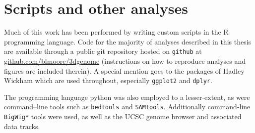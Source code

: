 \documentclass[a4paper,11pt,oneside]{book}
\begin{document}
\section{Scripts and other analyses}

Much of this work has been performed by writing custom scripts in the R programming language.\cite{Ihaka1996} Code for the majority of analyses described in this thesis are available through a public git repository hosted on \texttt{github} at \href{https://github.com/blmoore/3dgenome}{github.com/blmoore/3dgenome} (instructions on how to reproduce analyses and figures are included therein). A special mention goes to the packages of Hadley Wickham which are used throughout, especially \texttt{ggplot2}\cite{ggplot2} and \texttt{dplyr}\cite{dplyr}.

The programming language python\cite{rossum1995} was also employed to a lesser-extent, as were command--line tools such as \texttt{bedtools}\cite{Quinlan2010} and \texttt{SAMtools}\cite{Li2009}. Additionally command-line \texttt{BigWig*} tools\cite{Kent2010} were used, as well as the UCSC genome browser and associated data tracks.\cite{Kent2002, Raney2014, Kuhn2013a}

\ifstandalone
\begin{small}

\end{small}
\fi
\end{document}
